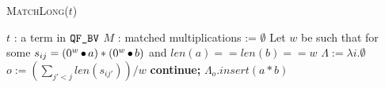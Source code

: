 \begin{algorithm}[t]
 \caption{\textsc{MatchLong}($t$)}
 \label{alg:long}
 \begin{algorithmic}[1]
   \Require $t$ : a term in $\texttt{QF\_BV}$
   \Ensure $M$ : matched multiplications := $\emptyset$
   \State Let $w$ be such that for some $s_{ij} = (0^{w} \mathop{\bullet} a) * (0^{w} \mathop{\bullet} b)$ and  $len(a) ==len(b) == w$ %
   \State $\Lambda := \lambda i. \emptyset$
   \State $o := (\sum_{j' < j} len( s_{ij'}))/w$
    {\bf continue;}
   \State $\Lambda_o.insert( a * b )$
   \Else~\Return{$\emptyset$}
   \EndIf
   \EndFor
   \State {}
   \EndIf
   \State \Return{$\emptyset$}
 \end{algorithmic}
\end{algorithm}  



